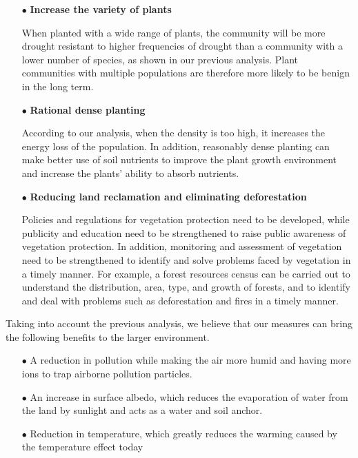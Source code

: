 \documentclass[12pt]{article}  %
\begin{document}
\begin{itemize}
\vspace{-0.4cm}
\item[$\bullet$] \textbf{Increase the variety of plants}

\vspace{-0.2cm}
When planted with a wide range of plants, the community will be more drought resistant to higher frequencies of drought than a community with a lower number of species, as shown in our previous analysis. Plant communities with multiple populations are therefore more likely to be benign in the long term.


\item[$\bullet$] \textbf{Rational dense planting}

\vspace{-0.2cm}
According to our analysis, when the density is too high, it increases the energy loss of the population. In addition, reasonably dense planting can make better use of soil nutrients to improve the plant growth environment and increase the plants' ability to absorb nutrients.

\vspace{-0.2cm}
\item[$\bullet$] \textbf{Reducing land reclamation and eliminating deforestation}

\vspace{-0.2cm}
Policies and regulations for vegetation protection need to be developed, while publicity and education need to be strengthened to raise public awareness of vegetation protection. In addition, monitoring and assessment of vegetation need to be strengthened to identify and solve problems faced by vegetation in a timely manner. For example, a forest resources census can be carried out to understand the distribution, area, type, and growth of forests, and to identify and deal with problems such as deforestation and fires in a timely manner.
\end{itemize}
\vspace{-0.5cm}

Taking into account the previous analysis, we believe that our measures can bring the following benefits to the larger environment.
\vspace{-0.2cm}

\begin{itemize}
\vspace{-0.2cm}
\item[$\bullet$]  A reduction in pollution while making the air more humid and having more ions to trap airborne pollution particles.
\vspace{-0.2cm}
\item[$\bullet$] An increase in surface albedo, which reduces the evaporation of water from the land by sunlight and acts as a water and soil anchor.
\vspace{-0.2cm}
\item[$\bullet$] Reduction in temperature, which greatly reduces the warming caused by the temperature effect today
\end{itemize}
\end{document}
